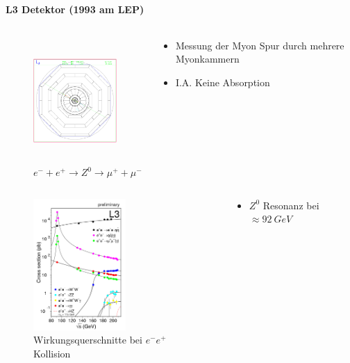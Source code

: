 \begin{iframe}
	\framesubtitle{L3 Detektor (1993 am LEP)}

\begin{columns}
		\begin{column}{0.40\textwidth}
	\begin{figure}
		\includegraphics[height=4.70cm]{img/muon}
		\caption*{$e^- +e^+ \rightarrow Z^0 \rightarrow \mu^+ + \mu^-$ \cite{huz0}}
	\end{figure}
\end{column}
		\begin{column}{0.58\textwidth}
			\begin{itemize}
				\item Messung der Myon Spur durch mehrere Myonkammern
				\item I.A. Keine Absorption
			\end{itemize}
\end{column}
\end{columns}
\end{iframe}

\begin{iframe}
	\begin{columns}
		\begin{column}{0.49\textwidth}
	\begin{figure}
		\includegraphics[height=5cm]{img/l3wirk}
		\caption*{Wirkungsquerschnitte bei $e^-e^+$ Kollision \cite{l3hp}}
	\end{figure}
\end{column}
		\begin{column}{0.49\textwidth}
			\begin{itemize}
				\item $Z^0$ Resonanz bei $\approx \SI{92}{GeV}$
			\end{itemize}
\end{column}
\end{columns}
\end{iframe}

